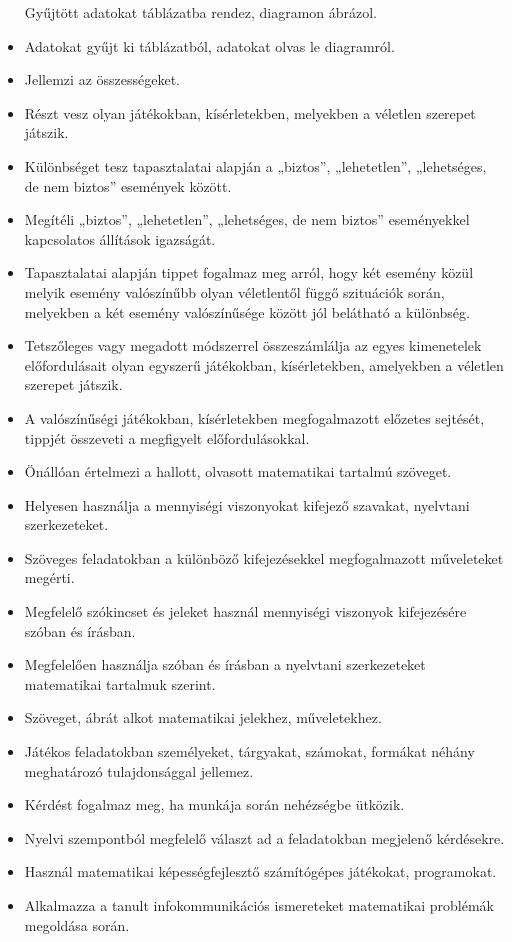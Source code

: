 \begin{itemize}
  Gyűjtött adatokat táblázatba rendez, diagramon ábrázol.
\item
  Adatokat gyűjt ki táblázatból, adatokat olvas le diagramról.
\item
  Jellemzi az összességeket.
\item
  Részt vesz olyan játékokban, kísérletekben, melyekben a véletlen
  szerepet játszik.
\item
  Különbséget tesz tapasztalatai alapján a „biztos'', „lehetetlen'',
  „lehetséges, de nem biztos'' események között.
\item
  Megítéli „biztos'', „lehetetlen'', „lehetséges, de nem biztos''
  eseményekkel kapcsolatos állítások igazságát.
\item
  Tapasztalatai alapján tippet fogalmaz meg arról, hogy két esemény
  közül melyik esemény valószínűbb olyan véletlentől függő szituációk
  során, melyekben a két esemény valószínűsége között jól belátható a
  különbség.
\item
  Tetszőleges vagy megadott módszerrel összeszámlálja az egyes
  kimenetelek előfordulásait olyan egyszerű játékokban, kísérletekben,
  amelyekben a véletlen szerepet játszik.
\item
  A valószínűségi játékokban, kísérletekben megfogalmazott előzetes
  sejtését, tippjét összeveti a megfigyelt előfordulásokkal.
\item
  Önállóan értelmezi a hallott, olvasott matematikai tartalmú szöveget.
\item
  Helyesen használja a mennyiségi viszonyokat kifejező szavakat,
  nyelvtani szerkezeteket.
\item
  Szöveges feladatokban a különböző kifejezésekkel megfogalmazott
  műveleteket megérti.
\item
  Megfelelő szókincset és jeleket használ mennyiségi viszonyok
  kifejezésére szóban és írásban.
\item
  Megfelelően használja szóban és írásban a nyelvtani szerkezeteket
  matematikai tartalmuk szerint.
\item
  Szöveget, ábrát alkot matematikai jelekhez, műveletekhez.
\item
  Játékos feladatokban személyeket, tárgyakat, számokat, formákat néhány
  meghatározó tulajdonsággal jellemez.
\item
  Kérdést fogalmaz meg, ha munkája során nehézségbe ütközik.
\item
  Nyelvi szempontból megfelelő választ ad a feladatokban megjelenő
  kérdésekre.
\item
  Használ matematikai képességfejlesztő számítógépes játékokat,
  programokat.
\item
  Alkalmazza a tanult infokommunikációs ismereteket matematikai
  problémák megoldása során.
\end{itemize}

